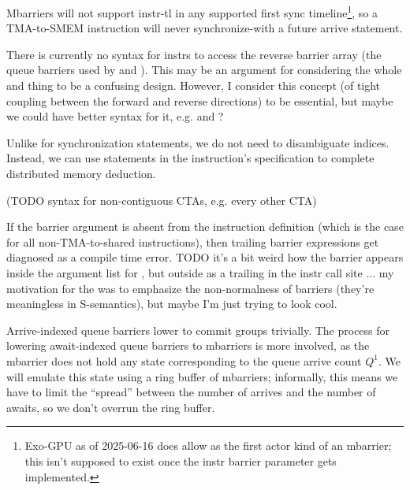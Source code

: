 \filbreak
Mbarriers will not support  instr-tl in any supported first sync timeline\footnote{Exo-GPU as of 2025-06-16 does allow  as the first actor kind of an mbarrier; this isn't supposed to exist once the instr barrier parameter gets implemented.}, so a TMA-to-SMEM instruction will never synchronize-with a future arrive statement.

\filbreak
There is currently no syntax for instrs to access the reverse barrier array (the queue barriers used by  and ).
This may be an argument for considering the whole  and  thing to be a confusing design.
However, I consider this concept (of tight coupling between the forward and reverse directions) to be essential, but maybe we could have better syntax for it, e.g.  and ?

\filbreak
{} Unlike for synchronization statements, we do not need to disambiguate \lighttt{:} indices.
Instead, we can use  statements in the instruction's  specification to complete distributed memory deduction.



(TODO syntax for non-contiguous CTAs, e.g. every other CTA)

\filbreak
If the barrier argument is absent from the instruction definition (which is the case for all non-TMA-to-shared instructions), then trailing barrier expressions get diagnosed as a compile time error.
TODO it's a bit weird how the barrier appears inside the argument list for , but outside as a trailing  in the instr call site ... my motivation for the \lighttt{>>} was to emphasize the non-normalness of barriers (they're meaningless in S-semantics), but maybe I'm just trying to look cool.

\newpage
{}
\label{ch:mbarrier}

Arrive-indexed queue barriers lower to commit groups trivially.
The process for lowering await-indexed queue barriers to mbarriers is more involved, as the mbarrier does not hold any state corresponding to the queue arrive count $Q^1$.
We will emulate this state using a ring buffer of mbarriers; informally, this means we have to limit the ``spread'' between the number of arrives and the number of awaits, so we don't overrun the ring buffer.

